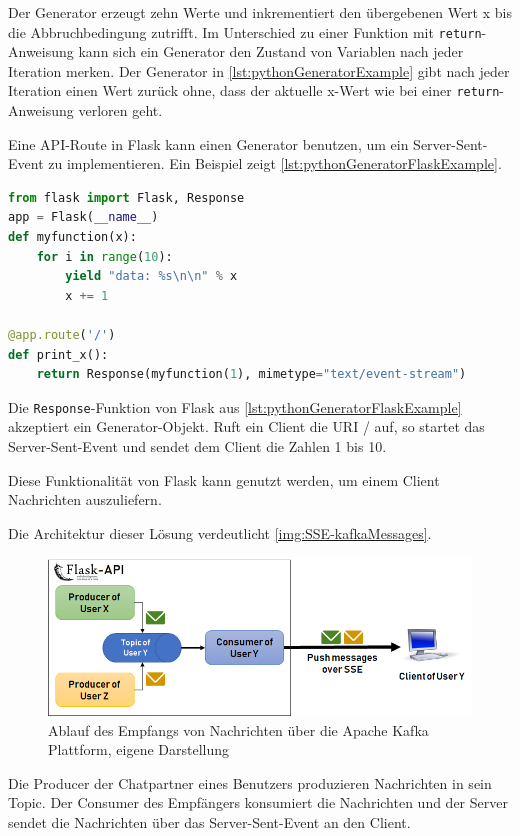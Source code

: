 \documentclass[a4paper,titlepage,halfparskip,12pt]{scrreprt}
\begin{document}
\begin{onehalfspacing}
Der Generator erzeugt zehn Werte und inkrementiert den übergebenen Wert x bis die Abbruchbedingung zutrifft. Im Unterschied zu einer Funktion mit \texttt{return}-Anweisung kann sich ein Generator den Zustand von Variablen nach jeder Iteration merken. Der Generator in \autoref{lst:pythonGeneratorExample} gibt nach jeder Iteration einen Wert zurück ohne, dass der aktuelle x-Wert wie bei einer \texttt{return}-Anweisung verloren geht.

Eine \acs{API}-Route in Flask kann einen Generator benutzen, um ein Server-Sent-Event zu implementieren. Ein Beispiel zeigt \autoref{lst:pythonGeneratorFlaskExample}.

\begin{lstlisting}[language=python, caption={Beispiel: Code für ein Server-Sent-Event in Python Flask}, label={lst:pythonGeneratorFlaskExample}]
from flask import Flask, Response
app = Flask(__name__)
def myfunction(x):
    for i in range(10):
        yield "data: %s\n\n" % x
        x += 1

@app.route('/')
def print_x():
    return Response(myfunction(1), mimetype="text/event-stream")
\end{lstlisting}

Die \texttt{Response}-Funktion von Flask aus \autoref{lst:pythonGeneratorFlaskExample} akzeptiert ein Generator-Objekt. Ruft ein Client die  \acs{URI} / auf, so startet das Server-Sent-Event und sendet dem Client die Zahlen 1 bis 10.

Diese Funktionalität von Flask kann genutzt werden, um einem Client Nachrichten auszuliefern.

Die Architektur dieser Lösung verdeutlicht \autoref{img:SSE-kafkaMessages}.

\begin{figure}[h]
	\centering
	\includegraphics[width=.9\textwidth]{images/SSE-kafkaMessages}
	\caption{Ablauf des Empfangs von Nachrichten über die Apache Kafka Plattform, eigene Darstellung}
	\label{img:SSE-kafkaMessages}
\end{figure}

Die Producer der Chatpartner eines Benutzers produzieren Nachrichten in sein Topic. Der Consumer des Empfängers konsumiert die Nachrichten und der Server sendet die Nachrichten über das Server-Sent-Event an den Client.


\end{onehalfspacing}
\end{document}
